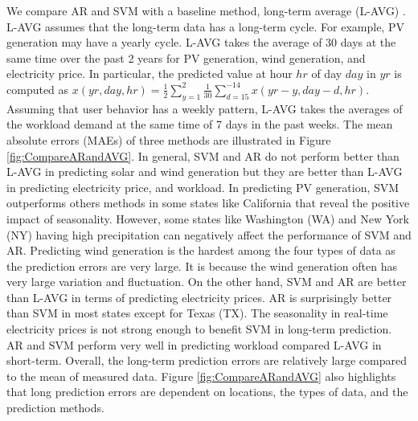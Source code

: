 We compare AR and SVM with a baseline method, long-term average
(L-AVG) {\cite{sinden2007characteristics}}. L-AVG assumes that the
long-term data has a long-term cycle. For example, PV generation may
have a yearly cycle. L-AVG takes the average of 30 days at the same
time over the past 2 years for PV generation, wind generation, and
electricity price. In particular, the predicted value at hour $hr$ of
day $day$ in $yr$ is computed as $x(yr, day,hr) =
\frac{1}{2}\sum_{y=1}^{2}\frac{1}{30}\sum_{d=15}^{-14}x(yr-y,day-d,hr)
.$ Assuming that user behavior has a weekly pattern, L-AVG takes the
averages of the workload demand at the same time of 7 days in the past
weeks. The mean absolute errors (MAEs) of three methods are
illustrated in Figure \ref{fig:CompareARandAVG}. In general, SVM and
AR do not perform better than L-AVG in predicting solar and wind
generation but they are better than L-AVG in predicting electricity
price, and workload. In predicting PV generation, SVM outperforms
others methods in some states like California that reveal the positive
impact of seasonality. However, some states like Washington (WA) and
New York (NY) having high precipitation can negatively affect the
performance of SVM and AR. Predicting wind generation is the hardest
among the four types of data as the prediction errors are very
large. It is because the wind generation often has very large
variation and fluctuation. On the other hand, SVM and AR are better
than L-AVG in terms of predicting electricity prices. AR is
surprisingly better than SVM in most states except for Texas (TX). The
seasonality in real-time electricity prices is not strong enough to
benefit SVM in long-term prediction. AR and SVM perform very well in
predicting workload compared L-AVG in short-term. Overall, the
long-term prediction errors are relatively large compared to the mean
of measured data. Figure {\ref{fig:CompareARandAVG}} also highlights
that long prediction errors are dependent on locations, the types of
data, and the prediction methods. %


